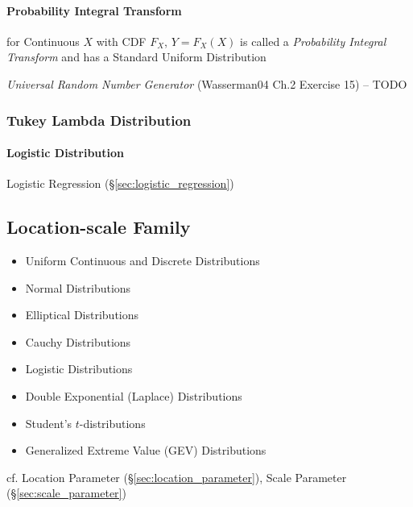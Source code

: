 \paragraph{Probability Integral Transform}
\label{sec:probability_integral_transform}\hfill

for Continuous $X$ with CDF $F_X$, $Y = F_X(X)$ is called a \emph{Probability
  Integral Transform} and has a Standard Uniform Distribution

\emph{Universal Random Number Generator} (Wasserman04 Ch.2 Exercise 15) -- TODO



\subsubsection{Tukey Lambda Distribution}\label{sec:tukey_lambda_distribution}

\paragraph{Logistic Distribution}\label{sec:logistic_distribution}\hfill

\fist Logistic Regression (\S\ref{sec:logistic_regression})



\subsection{Location-scale Family}\label{sec:location_scale}

\begin{itemize}
  \item Uniform Continuous and Discrete Distributions
  \item Normal Distributions
  \item Elliptical Distributions
  \item Cauchy Distributions
  \item Logistic Distributions
  \item Double Exponential (Laplace) Distributions
  \item Student's $t$-distributions
  \item Generalized Extreme Value (GEV) Distributions
\end{itemize}


\fist cf. Location Parameter (\S\ref{sec:location_parameter}), Scale Parameter
(\S\ref{sec:scale_parameter})




